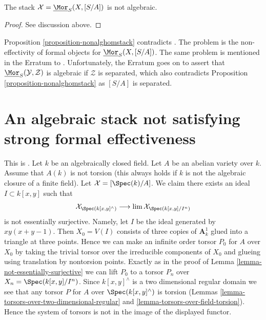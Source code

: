 \begin{proposition}
\label{proposition-nonalghomstack}
The stack $\mathcal{X} = \underline{\Mor}_S(X, [S/A])$ is not algebraic.
\end{proposition}

\begin{proof}
See discussion above.
\end{proof}

\begin{remark}
\label{remark-contradict-aoki}
Proposition \ref{proposition-nonalghomstack} contradicts
\cite[Theorem 1.1]{AokiHomStacks}. The problem is the non-effectivity
of formal objects for $\underline{\Mor}_S(X, [S/A])$. The same problem
is mentioned in the Erratum \cite{AokiHomStacksErr} to
\cite{AokiHomStacks}. Unfortunately, the Erratum goes on
to assert that $\underline{\Mor}_S(\mathcal{Y}, \mathcal{Z})$
is algebraic if $\mathcal{Z}$ is separated, which also contradicts
Proposition \ref{proposition-nonalghomstack} as $[S/A]$ is separated.
\end{remark}








\section{An algebraic stack not satisfying strong formal effectiveness}
\label{section-non-formal-effectiveness}

\noindent
This is \cite[Example 4.12]{Bhatt-Algebraize}.
Let $k$ be an algebraically closed field.
Let $A$ be an abelian variety over $k$.
Assume that $A(k)$ is not torsion (this always holds if $k$
is not the algebraic closure of a finite field).
Let $\mathcal{X} = [\Spec(k)/A]$.
We claim there exists an ideal $I \subset k[x, y]$
such that
$$
\mathcal{X}_{\Spec(k[x, y]^\wedge)}
\longrightarrow
\lim \mathcal{X}_{\Spec(k[x, y]/I^n)}
$$
is not essentially surjective. Namely, let $I$
be the ideal generated by $xy(x + y - 1)$.
Then $X_0 = V(I)$ consists of three copies of $\mathbf{A}^1_k$
glued into a triangle at three points. Hence we can make an infinite order
torsor $P_0$ for $A$ over $X_0$ by taking the trivial torsor
over the irreducible components of $X_0$ and glueing
using translation by nontorsion points.
Exactly as in the proof of Lemma \ref{lemma-not-essentially-surjective}
we can lift $P_0$ to a torsor $P_n$ over $X_n = \Spec(k[x, y]/I^n)$.
Since $k[x, y]^\wedge$ is a two dimensional regular domain
we see that any torsor $P$ for $A$ over $\Spec(k[x, y]^\wedge)$
is torsion (Lemmas \ref{lemma-torsors-over-two-dimensional-regular}
and \ref{lemma-torsors-over-field-torsion}). Hence the system of
torsors is not in the image of the displayed functor.

